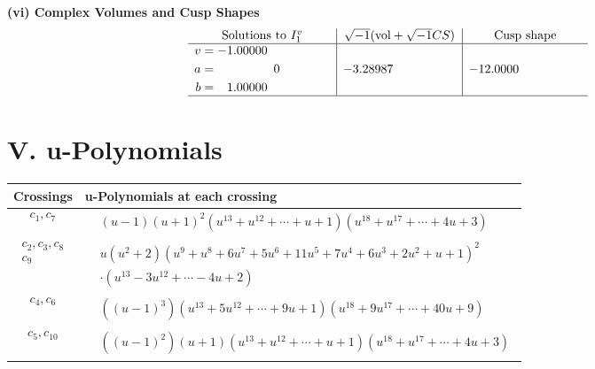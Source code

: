 \documentclass[1p]{elsarticle_modified}
\theoremstyle{definition}
\newcommand{\I}{\sqrt{-1}}
\begin{document}
\newpage\flushleft \textbf{(vi) Complex Volumes and Cusp Shapes}
$$\begin{array}{c|c|c}  
\text{Solutions to }I^v_{1}& \I (\text{vol} + \sqrt{-1}CS) & \text{Cusp shape}\\
 \hline 
\begin{aligned}
v &= -1.00000\phantom{ +0.000000I} \\
a &= \phantom{-0.000000 } 0 \\
b &= \phantom{-}1.00000\phantom{ +0.000000I}\end{aligned}
 & -3.28987\phantom{ +0.000000I} & -12.0000\phantom{ +0.000000I}\\
 \hline 
 \end{array}$$\newpage
\newpage\renewcommand{\arraystretch}{1}
\centering \section*{ V. u-Polynomials}
\begin{tabular}{m{50pt}|m{274pt}}
Crossings & \hspace{64pt}u-Polynomials at each crossing \\
\hline $$\begin{aligned}c_{1},c_{7}\end{aligned}$$&$\begin{aligned}
&(u-1)(u+1)^2(u^{13}+u^{12}+\cdots+u+1)(u^{18}+u^{17}+\cdots+4 u+3)
\end{aligned}$\\
\hline $$\begin{aligned}c_{2},c_{3},c_{8}\\c_{9}\end{aligned}$$&$\begin{aligned}
&u(u^2+2)(u^9+u^8+6 u^7+5 u^6+11 u^5+7 u^4+6 u^3+2 u^2+u+1)^2\\
&\cdot(u^{13}-3 u^{12}+\cdots-4 u+2)
\end{aligned}$\\
\hline $$\begin{aligned}c_{4},c_{6}\end{aligned}$$&$\begin{aligned}
&((u-1)^3)(u^{13}+5 u^{12}+\cdots+9 u+1)(u^{18}+9 u^{17}+\cdots+40 u+9)
\end{aligned}$\\
\hline $$\begin{aligned}c_{5},c_{10}\end{aligned}$$&$\begin{aligned}
&((u-1)^2)(u+1)(u^{13}+u^{12}+\cdots+u+1)(u^{18}+u^{17}+\cdots+4 u+3)
\end{aligned}$\\
\hline
\end{tabular}\newpage\renewcommand{\arraystretch}{1}
\end{document}
